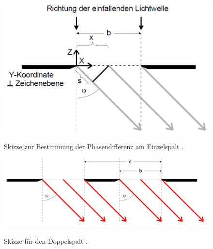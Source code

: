 \begin{figure}
	\centering
	\caption{Skizze zur Bestimmung der Phasendifferenz am Einzelspalt \cite{V406}.}
	\includegraphics[width=\linewidth-150pt,height=\textheight-150pt,keepaspectratio]{content/images/Einzelspalt.png}
	\label{fig:Einzelspalt}
\end{figure}

\begin{figure}
	\centering
	\caption{Skizze für den Doppelspalt \cite{V406}.}
	\includegraphics[width=\linewidth-70pt,height=\textheight-70pt,keepaspectratio]{content/images/Doppelspalt.png}
	\label{fig:Doppelspalt}
\end{figure}